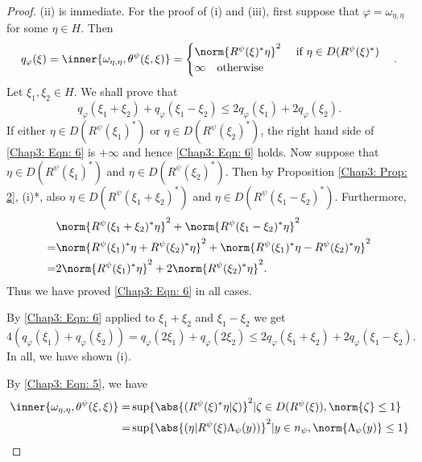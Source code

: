 \begin{proof}
    (ii) is immediate. For the proof of (i) and (iii), first suppose that $\varphi=\omega_{\eta,\eta}$ for some $\eta\in H$. Then
    \begin{equation}\label{Chap3: Eqn: 5}
        q_\varphi(\xi)=\inner{\omega_{\eta,\eta},\theta^\psi(\xi,\xi)}=\begin{cases}
            \norm{R^\psi(\xi)^*\eta}^2\quad \text{ if } \eta\in D(R^\psi(\xi)^*) \\
            \infty\quad \text{otherwise}
        \end{cases}.
    \end{equation}
    Let $\xi_1,\xi_2\in H$. We shall prove that
    \begin{equation}\label{Chap3: Eqn: 6}
        q_\varphi(\xi_1+\xi_2)+q_\varphi(\xi_1-\xi_2)\leq 2q_\varphi(\xi_1)+2q_\varphi(\xi_2).
    \end{equation}
    If either $\eta\in D(R^\psi(\xi_1)^*)$ or $\eta\in D(R^\psi(\xi_2)^*)$, the right hand side of \eqref{Chap3: Eqn: 6} is $+\infty$ and hence \eqref{Chap3: Eqn: 6} holds. Now suppose that $\eta\in D(R^\psi(\xi_1)^*)$ and $\eta\in D(R^\psi(\xi_2)^*)$. Then by Proposition \ref{Chap3: Prop: 2}, (i)*, also $\eta\in D(R^\psi(\xi_1+\xi_2)^*)$ and $\eta\in D(R^\psi(\xi_1-\xi_2)^*)$. Furthermore,
    \[
        \begin{split}
            &\norm{R^\psi(\xi_1+\xi_2)^*\eta}^2+\norm{R^\psi(\xi_1-\xi_2)^*\eta}^2\\
            =&\norm{R^\psi(\xi_1)^*\eta+R^\psi(\xi_2)^*\eta}^2+\norm{R^\psi(\xi_1)^*\eta-R^\psi(\xi_2)^*\eta}^2\\
            =&2\norm{R^\psi(\xi_1)^*\eta}^2+2\norm{R^\psi(\xi_2)^*\eta}^2.
        \end{split}
    \]
    Thus we have proved \eqref{Chap3: Eqn: 6} in all cases.\par
    By \eqref{Chap3: Eqn: 6} applied to $\xi_1+\xi_2$ and $\xi_1-\xi_2$ we get
    \[
        4(q_\varphi(\xi_1)+q_\varphi(\xi_2))=q_\varphi(2\xi_1)+q_\varphi(2\xi_2)\leq 2q_\varphi(\xi_1+\xi_2)+2q_\varphi(\xi_1-\xi_2).
    \]
    In all, we have shown (i).\par
    By \eqref{Chap3: Eqn: 5}, we have
    \[
        \begin{split}
            \inner{\omega_{\eta,\eta},\theta^\psi(\xi,\xi)}=&\sup\{\abs{(R^\psi(\xi)^*\eta|\zeta)}^2|\zeta\in D(R^\psi(\xi)),\norm{\zeta}\leq 1\}\\
            =&\sup\{\abs{(\eta|R^\psi(\xi)\Lambda_\psi(y))}^2|y\in n_\psi,\norm{\Lambda_\psi(y)}\leq 1\}\\

\end{split}\]
\end{proof}
